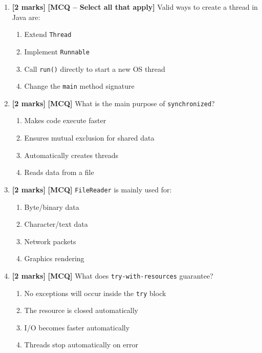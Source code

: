 \documentclass[11pt,a4paper]{article}
\newcommand{\EMarks}{\textbf{[2 marks]} }
\begin{document}
\begin{enumerate}[label=\textbf{E\arabic*.}, leftmargin=*]
  \item \EMarks \textbf{[MCQ -- Select all that apply]} Valid ways to create a thread in Java are:
    \begin{enumerate}[label=(\Alph*), leftmargin=*]
      \item Extend \texttt{Thread}
      \item Implement \texttt{Runnable}
      \item Call \texttt{run()} directly to start a new OS thread
      \item Change the \texttt{main} method signature
    \end{enumerate}

  \item \EMarks \textbf{[MCQ]} What is the main purpose of \texttt{synchronized}?
    \begin{enumerate}[label=(\Alph*), leftmargin=*]
      \item Makes code execute faster
      \item Ensures mutual exclusion for shared data
      \item Automatically creates threads
      \item Reads data from a file
    \end{enumerate}

  \item \EMarks \textbf{[MCQ]} \texttt{FileReader} is mainly used for:
    \begin{enumerate}[label=(\Alph*), leftmargin=*]
      \item Byte/binary data
      \item Character/text data
      \item Network packets
      \item Graphics rendering
    \end{enumerate}

  \item \EMarks \textbf{[MCQ]} What does \texttt{try-with-resources} guarantee?
    \begin{enumerate}[label=(\Alph*), leftmargin=*]
      \item No exceptions will occur inside the \texttt{try} block
      \item The resource is closed automatically
      \item I/O becomes faster automatically
      \item Threads stop automatically on error
    \end{enumerate}
\end{enumerate}
\end{document}
